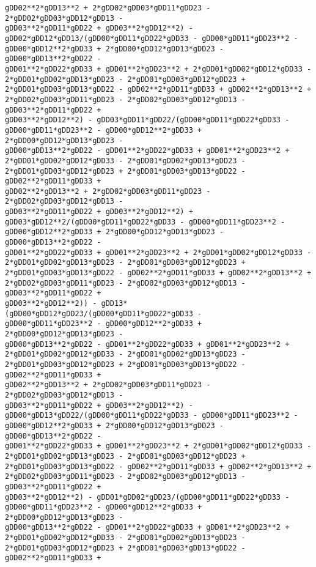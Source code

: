 \documentclass[landscape,letterpaper,10pt,english]{article}
\begin{document}
\begin{Verbatim}[commandchars=\\\{\}]
gDD02**2*gDD13**2 + 2*gDD02*gDD03*gDD11*gDD23 - 2*gDD02*gDD03*gDD12*gDD13 -
gDD03**2*gDD11*gDD22 + gDD03**2*gDD12**2) -
gDD02*gDD12*gDD13/(gDD00*gDD11*gDD22*gDD33 - gDD00*gDD11*gDD23**2 -
gDD00*gDD12**2*gDD33 + 2*gDD00*gDD12*gDD13*gDD23 - gDD00*gDD13**2*gDD22 -
gDD01**2*gDD22*gDD33 + gDD01**2*gDD23**2 + 2*gDD01*gDD02*gDD12*gDD33 -
2*gDD01*gDD02*gDD13*gDD23 - 2*gDD01*gDD03*gDD12*gDD23 +
2*gDD01*gDD03*gDD13*gDD22 - gDD02**2*gDD11*gDD33 + gDD02**2*gDD13**2 +
2*gDD02*gDD03*gDD11*gDD23 - 2*gDD02*gDD03*gDD12*gDD13 - gDD03**2*gDD11*gDD22 +
gDD03**2*gDD12**2) - gDD03*gDD11*gDD22/(gDD00*gDD11*gDD22*gDD33 -
gDD00*gDD11*gDD23**2 - gDD00*gDD12**2*gDD33 + 2*gDD00*gDD12*gDD13*gDD23 -
gDD00*gDD13**2*gDD22 - gDD01**2*gDD22*gDD33 + gDD01**2*gDD23**2 +
2*gDD01*gDD02*gDD12*gDD33 - 2*gDD01*gDD02*gDD13*gDD23 -
2*gDD01*gDD03*gDD12*gDD23 + 2*gDD01*gDD03*gDD13*gDD22 - gDD02**2*gDD11*gDD33 +
gDD02**2*gDD13**2 + 2*gDD02*gDD03*gDD11*gDD23 - 2*gDD02*gDD03*gDD12*gDD13 -
gDD03**2*gDD11*gDD22 + gDD03**2*gDD12**2) +
gDD03*gDD12**2/(gDD00*gDD11*gDD22*gDD33 - gDD00*gDD11*gDD23**2 -
gDD00*gDD12**2*gDD33 + 2*gDD00*gDD12*gDD13*gDD23 - gDD00*gDD13**2*gDD22 -
gDD01**2*gDD22*gDD33 + gDD01**2*gDD23**2 + 2*gDD01*gDD02*gDD12*gDD33 -
2*gDD01*gDD02*gDD13*gDD23 - 2*gDD01*gDD03*gDD12*gDD23 +
2*gDD01*gDD03*gDD13*gDD22 - gDD02**2*gDD11*gDD33 + gDD02**2*gDD13**2 +
2*gDD02*gDD03*gDD11*gDD23 - 2*gDD02*gDD03*gDD12*gDD13 - gDD03**2*gDD11*gDD22 +
gDD03**2*gDD12**2)) - gDD13*(gDD00*gDD12*gDD23/(gDD00*gDD11*gDD22*gDD33 -
gDD00*gDD11*gDD23**2 - gDD00*gDD12**2*gDD33 + 2*gDD00*gDD12*gDD13*gDD23 -
gDD00*gDD13**2*gDD22 - gDD01**2*gDD22*gDD33 + gDD01**2*gDD23**2 +
2*gDD01*gDD02*gDD12*gDD33 - 2*gDD01*gDD02*gDD13*gDD23 -
2*gDD01*gDD03*gDD12*gDD23 + 2*gDD01*gDD03*gDD13*gDD22 - gDD02**2*gDD11*gDD33 +
gDD02**2*gDD13**2 + 2*gDD02*gDD03*gDD11*gDD23 - 2*gDD02*gDD03*gDD12*gDD13 -
gDD03**2*gDD11*gDD22 + gDD03**2*gDD12**2) -
gDD00*gDD13*gDD22/(gDD00*gDD11*gDD22*gDD33 - gDD00*gDD11*gDD23**2 -
gDD00*gDD12**2*gDD33 + 2*gDD00*gDD12*gDD13*gDD23 - gDD00*gDD13**2*gDD22 -
gDD01**2*gDD22*gDD33 + gDD01**2*gDD23**2 + 2*gDD01*gDD02*gDD12*gDD33 -
2*gDD01*gDD02*gDD13*gDD23 - 2*gDD01*gDD03*gDD12*gDD23 +
2*gDD01*gDD03*gDD13*gDD22 - gDD02**2*gDD11*gDD33 + gDD02**2*gDD13**2 +
2*gDD02*gDD03*gDD11*gDD23 - 2*gDD02*gDD03*gDD12*gDD13 - gDD03**2*gDD11*gDD22 +
gDD03**2*gDD12**2) - gDD01*gDD02*gDD23/(gDD00*gDD11*gDD22*gDD33 -
gDD00*gDD11*gDD23**2 - gDD00*gDD12**2*gDD33 + 2*gDD00*gDD12*gDD13*gDD23 -
gDD00*gDD13**2*gDD22 - gDD01**2*gDD22*gDD33 + gDD01**2*gDD23**2 +
2*gDD01*gDD02*gDD12*gDD33 - 2*gDD01*gDD02*gDD13*gDD23 -
2*gDD01*gDD03*gDD12*gDD23 + 2*gDD01*gDD03*gDD13*gDD22 - gDD02**2*gDD11*gDD33 +

\end{Verbatim}
\end{document}
